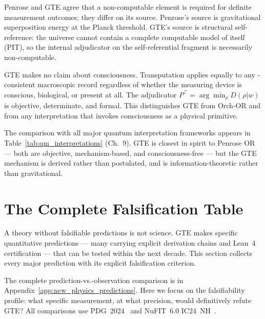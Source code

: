 \documentclass[11pt,openany]{book}
\theoremstyle{remark}
\newcommand{\PSC}{\text{PSC}}
\begin{document}
Penrose and GTE agree that a non-computable element is required for definite measurement
outcomes; they differ on its source.  Penrose's source is gravitational superposition
energy at the Planck threshold.  GTE's source is structural self-reference: the universe
cannot contain a complete computable model of itself (PIT), so the internal adjudicator
on the self-referential fragment is necessarily non-computable.

GTE makes no claim about consciousness.  Transputation applies equally to any
\PSC-consistent macroscopic record regardless of whether the measuring device is
conscious, biological, or present at all.  The adjudicator $P^\top = \arg\min_\rho
D(\rho|w)$ is objective, determinate, and formal.  This distinguishes GTE from Orch-OR
and from any interpretation that invokes consciousness as a physical primitive.

The comparison with all major quantum interpretation frameworks appears in
Table~\ref{tab:qm_interpretations} (Ch.~9).  GTE is
closest in spirit to Penrose OR — both are objective, mechanism-based, and
consciousness-free — but the GTE mechanism is derived rather than postulated, and is
information-theoretic rather than gravitational.

\section{The Complete Falsification Table}
\label{sec:falsification_table}

A theory without falsifiable predictions is not science.  GTE makes specific quantitative
predictions — many carrying explicit derivation chains and Lean~4 certification — that
can be tested within the next decade.  This section collects every major prediction with
its explicit falsification criterion.

The complete prediction-vs.-observation comparison is in Appendix~\ref{app:new_physics_predictions}.  Here we focus on
the falsifiability profile: what specific measurement, at what precision, would
definitively refute GTE?  All comparisons use PDG~2024~\cite{ParticleDataGroup2024} and
NuFIT~6.0 IC24~NH~\cite{NuFIT60}.

\FloatBarrier
\end{document}
